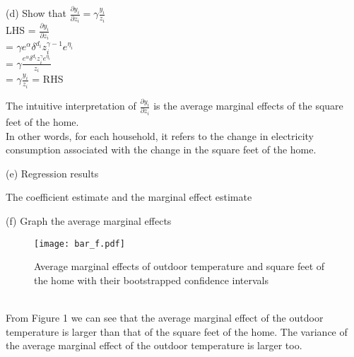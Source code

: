 \documentclass{article}
\begin{document}
\noindent
(d) Show that $\frac{\partial y_i}{\partial z_i} = \gamma \frac{y_i}{z_i}$ 
\bigskip
\\
LHS = $\frac{\partial y_i}{\partial z_i}$
\bigskip
\\
= $\gamma e^{\alpha} \delta^{d_i} z_i^{\gamma - 1} e^{\eta_i}$
\bigskip
\\
= $\gamma \frac{e^{\alpha} \delta^{d_i} z_i^{\gamma} e^{\eta_i}}{z_i}$
\bigskip
\\
= $\gamma \frac{y_i}{z_i}$ = RHS
\bigskip
\bigskip

\noindent
The intuitive interpretation of $\frac{\partial y_i}{\partial z_i}$ is the average marginal effects of the square feet of the home.
\bigskip
\\
In other words, for each household, it refers to the change in electricity consumption associated with the change in the square feet of the home.
\bigskip
\bigskip

\noindent
(e) Regression results
\begin{table}[hbt!]
    \centering
    
    \caption{The coefficient estimate and the marginal effect estimate}
    \label{tab:table_e}
\end{table}


\bigskip
\bigskip
\noindent
(f)  Graph the average marginal effects
\begin{figure}[hbt!]
    \centering
    \texttt{[image: bar\_f.pdf]}
    \caption{Average marginal effects of outdoor temperature and square feet of the home with their bootstrapped confidence intervals}
    \label{fig:bar_f}
\end{figure}
\bigskip
\\
From Figure 1 we can see that the average marginal effect of the outdoor temperature is larger than that of the square feet of the home. The variance of the average marginal effect of the outdoor temperature is larger too. 
\end{document}
